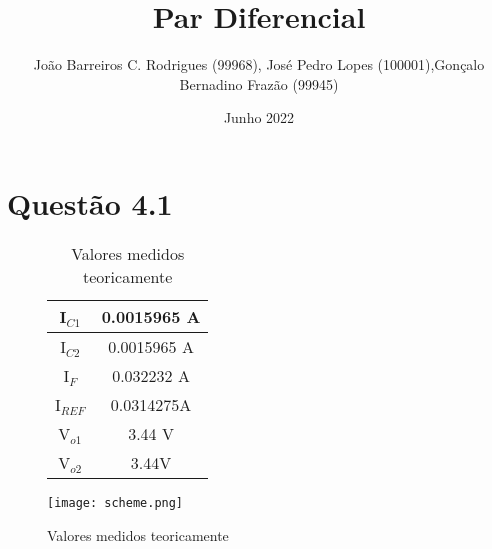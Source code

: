 \documentclass[a4paper,9pt]{extarticle}
\title{\vspace{-3cm} \large {\bfseries{Par Diferencial}}}
\author{João Barreiros C. Rodrigues (99968), José Pedro Lopes (100001),Gonçalo Bernadino Frazão (99945)}
\date{Junho 2022}
\begin{document}
	\maketitle
	\vspace{-1cm}
	 \section{Questão 4.1}
	 \begin{figure}[h]
                   \centering
                  \begin{minipage}[c]{0.2 \textwidth}
                          \begin{table}[H]
                                  \captionsetup{justification=centering}
                                                   \begin{tabular}{|c||c|}
                                          \hline
                                                  I$_{C1}$  & 0.0015965 A\\ \hline
                                                  I$_{C2}$  & 0.0015965 A\\ \hline
                                                  I$_{F}$  & 0.032232 A\\ \hline
                                                  I$_{REF}$  & 0.0314275A\\ \hline
                                                  V$_{o1}$  & 3.44 V\\ \hline
                                                  V$_{o2}$ & 3.44V\\ \hline

                                  \end{tabular}
                                \caption{Valores medidos teoricamente}
                          \end{table}
                  \end{minipage}
                  \hspace{0.1\textwidth}
                                  \begin{minipage}[T]{0.4\textwidth}
                                            \centering
                                            \captionsetup{justification=centering}
                                            \texttt{[image: scheme.png]}

                                  \end{minipage}
                          \end{figure}
\end{document}
